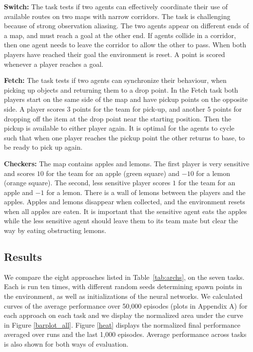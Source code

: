 \documentclass{article}
\begin{document}
\begin{SCfigure}
{\bf Switch:} The task tests if two agents can effectively coordinate their use of available routes on two maps with narrow corridors. The task is challenging because of strong observation aliasing. The two agents appear on different ends of a map, and must reach a goal at the other end. If agents collide in a corridor, then one agent needs to leave the corridor to allow the other to pass. When both players have reached their goal the environment is reset. A point is scored whenever a player reaches a goal. 

{\bf Fetch:} The task tests if two agents can synchronize their behaviour, when picking up objects and returning them to a drop point. In the Fetch task both players start on the same side of the map and have pickup points on the opposite side. A player scores $3$ points for the team for pick-up, and another $5$ points for dropping off the item at the drop point near the starting position. Then the pickup is available to either player again. It is optimal for the agents to cycle such that when one player reaches the pickup point the other returns to base, to be ready to pick up again. 





{\bf Checkers:} 
The map contains apples and lemons. The first player is very sensitive and scores $10$ for the team for an apple (green square) and $-10$ for a lemon (orange square). The second, less sensitive player scores $1$ for the team for an apple and $-1$ for a lemon. There is a wall of lemons between the players and the apples. Apples and lemons disappear when collected, and the environment resets when all apples are eaten. It is important that the sensitive agent eats the apples while the less sensitive agent should leave them to its team mate but clear the way by eating obstructing lemons. 



\subsection{Results}


We compare the eight approaches listed in Table~\ref{tab:archs}, on the seven tasks. Each is run ten times, with different random seeds determining spawn points in the environment, as well as initializations of the neural networks. 
We calculated curves of the average performance over 50,000 episodes (plots in Appendix A) for each approach on each task and we display the normalized area under the curve in Figure \ref{barplot_all}. Figure \ref{heat} displays the normalized final performance averaged over runs and the last 1,000 episodes. Average performance across tasks is also shown for both ways of evaluation.


\end{SCfigure}
\end{document}
